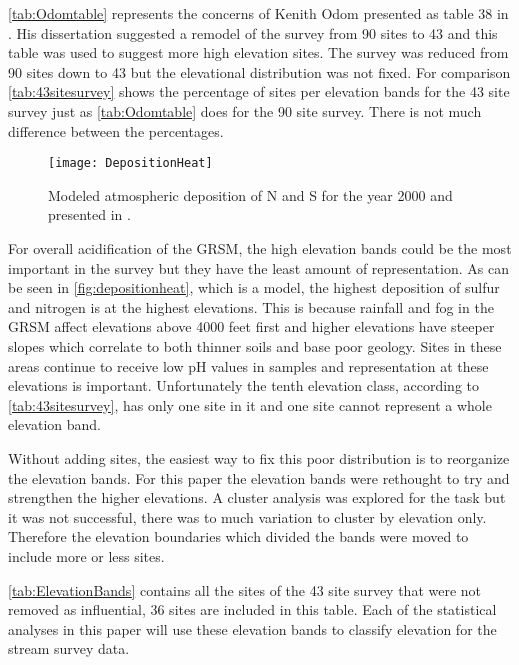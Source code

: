 



\autoref{tab:Odomtable} represents the concerns of Kenith Odom presented as table 38 in \citet{odom2003}.
His dissertation suggested a remodel of the survey from 90 sites to 43 and this table was used to suggest more high elevation sites.
The survey was reduced from 90 sites down to 43 but the elevational distribution was not fixed.
For comparison \autoref{tab:43sitesurvey} shows the percentage of sites per elevation bands for the 43 site survey just as \autoref{tab:Odomtable} does for the 90 site survey.
There is not much difference between the percentages.

\begin{figure}[h!]
  \centering
  \texttt{[image: DepositionHeat]}\\
  \caption{ Modeled atmospheric deposition of N and S for the year 2000 and presented in \citet{weathers2006}.}\label{fig:depositionheat}
\end{figure}

For overall acidification of the GRSM, the high elevation bands could be the most important in the survey but they have the least amount of representation.
As can be seen in \autoref{fig:depositionheat}, which is a model, the highest deposition of sulfur and nitrogen is at the highest elevations.
This is because rainfall and fog in the GRSM affect elevations above 4000 feet first and higher elevations have steeper slopes which correlate to both thinner soils and base poor geology.  
Sites in these areas continue to receive low pH values in samples and representation at these elevations is important.
Unfortunately the tenth elevation class, according to \autoref{tab:43sitesurvey}, has only one site in it and one site cannot represent a whole elevation band.

Without adding sites, the easiest way to fix this poor distribution is to reorganize the elevation bands. 
For this paper the elevation bands were rethought to try and strengthen the higher elevations.
A cluster analysis was explored for the task but it was not successful, there was to much variation to cluster by elevation only.
Therefore the elevation boundaries which divided the bands were moved to include more or less sites.



\autoref{tab:ElevationBands} contains all the sites of the 43 site survey that were not removed as influential, 36 sites are included in this table.
Each of the statistical analyses in this paper will use these elevation bands to classify elevation for the stream survey data.

